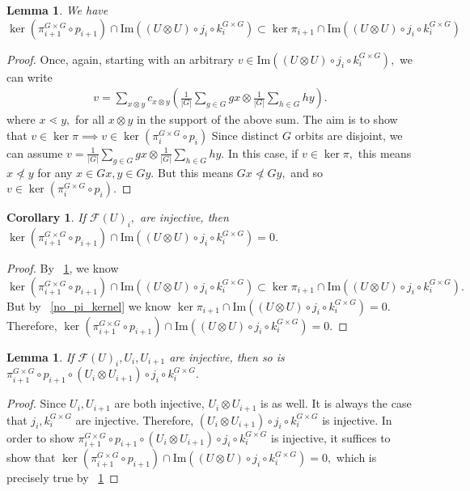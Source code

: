 \documentclass{amsart}
\newtheorem{cor}[subsubsection]{Corollary}
\newtheorem{lem}[subsubsection]{Lemma}
\newcommand\im{\text{Im}}
\begin{document}
\begin{lem}
\label{pi_gg_subset}
We have $\ker \left(\pi^{G\times G}_{i+1}\circ p_{i+1}\right) \cap \im((U\otimes U)\circ j_i\circ k^{G\times G}_i)\subset \ker \pi_{i+1} \cap \im((U\otimes U)\circ j_i\circ k^{G\times G}_i)$
\end{lem}
\begin{proof}
Once, again, starting with an arbitrary $v \in \im((U\otimes U)\circ j_i\circ k^{G\times G}_i),$ we can write
\begin{align*}
	v=\sum_{x\otimes y}^{}c_{x\otimes y}\left(\frac{1}{|G|}\sum_{g \in G}^{} gx\otimes \frac{1}{|G|}\sum_{h\in G}^{}hy\right).
\end{align*}
where $x \lessdot y,$ for all $x \otimes y$ in the support of the above sum. The aim is to show that $v \in \ker \pi \implies v \in \ker (\pi^{G\times G}_i \circ p_i)$ Since distinct $G$ orbits are disjoint, we can assume $v = \frac{1}{|G|}\sum_{g \in G}^{} gx\otimes \frac{1}{|G|}\sum_{h\in G}^{}hy.$ In this case, if $v \in \ker \pi,$ this means $x \not \lessdot y$ for any $x \in Gx,y \in Gy.$ But this means $Gx \not \lessdot Gy,$ and so $v \in \ker (\pi^{G\times G}_i \circ p_i).$ 
\end{proof}

\begin{cor}
\label{no_pi_gg_kernel}
If $\mathcal F(U)_i,$ are injective, then $\ker (\pi^{G\times G}_{i+1}\circ p_{i+1}) \cap \im((U\otimes U)\circ j_i\circ k^{G\times G}_i)=0.$
\end{cor}
\begin{proof}
By ~\ref{pi_gg_subset}, we know $\ker (\pi^{G\times G}_{i+1}\circ p_{i+1}) \cap \im((U\otimes U)\circ j_i\circ k^{G\times G}_i) \subset \ker \pi_{i+1} \cap \im((U\otimes U)\circ j_i\circ k^{G\times G}_i).$ But by ~\ref{no_pi_kernel} we know  $\ker \pi_{i+1} \cap \im((U\otimes U)\circ j_i\circ k^{G\times G}_i)=0.$ Therefore, $\ker (\pi^{G\times G}_{i+1}\circ p_{i+1}) \cap \im((U\otimes U)\circ j_i\circ k^{G\times G}_i)=0.$
\end{proof}

\begin{lem}
\label{injective_chain}
If $\mathcal F(U)_i,U_i,U_{i+1}$ are injective, then so is $\pi^{G\times G}_{i+1}\circ p_{i+1}\circ(U_i\otimes U_{i+1})\circ j_i\circ k^{G\times G}_i.$
\end{lem}
\begin{proof}
Since $U_i,U_{i+1}$ are both injective, $U_i \otimes U_{i+1}$ is as well. It is always the case that $j_i,k^{G\times G}_i$ are injective. Therefore, $(U_i\otimes U_{i+1})\circ j_i\circ k^{G\times G}_i$ is injective. In order to show $\pi^{G\times G}_{i+1}\circ p_{i+1}\circ(U_i\otimes U_{i+1})\circ j_i\circ k^{G\times G}_i$ is injective, it suffices to show that $\ker (\pi^{G\times G}_{i+1}\circ p_{i+1}) \cap \im((U\otimes U)\circ j_i\circ k^{G\times G}_i)=0,$ which is precisely true by ~\ref{no_pi_gg_kernel}
\end{proof}
\end{document}
